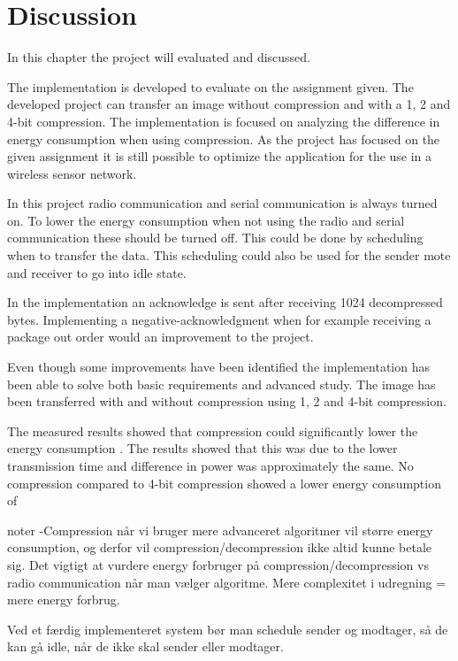 \chapter{Discussion}
\label{chp:disc}

In this chapter the project will evaluated and discussed.

The implementation is developed to evaluate on the assignment given. The developed project can transfer an image without compression and with a 1, 2 and 4-bit compression. The implementation is focused on analyzing the difference in energy consumption when using compression.  As the project has focused on the given assignment it is still possible to optimize the application for the use in a wireless sensor network.  

In this project radio communication and serial communication is always turned on. To lower the energy consumption when not using the radio and serial communication these should be turned off. This could be done by scheduling when to transfer the data. This scheduling could also be used for the sender mote and receiver to go into idle state. 

In the implementation an acknowledge is sent after receiving 1024 decompressed bytes. Implementing a negative-acknowledgment when for example receiving a package out order would an improvement to the project. 

Even though some improvements have been identified the implementation has been able to solve both basic requirements and advanced study. The image has been transferred with and without compression using 1, 2 and 4-bit compression. 

The measured results showed that compression could significantly lower the energy consumption . The results showed that this was due to the lower transmission time and difference in power was approximately the same. No compression compared to 4-bit compression showed a lower energy consumption of 




\vspace{2cm}
noter
-Compression når vi bruger mere advanceret algoritmer vil større energy consumption, og derfor vil compression/decompression ikke altid kunne betale sig. Det vigtigt at vurdere energy forbruger på compression/decompression vs radio communication når man vælger algoritme.
Mere complexitet i udregning = mere energy forbrug.

Ved et færdig implementeret system bør man schedule sender og modtager, så de kan gå idle, når de ikke skal sender eller modtager.

